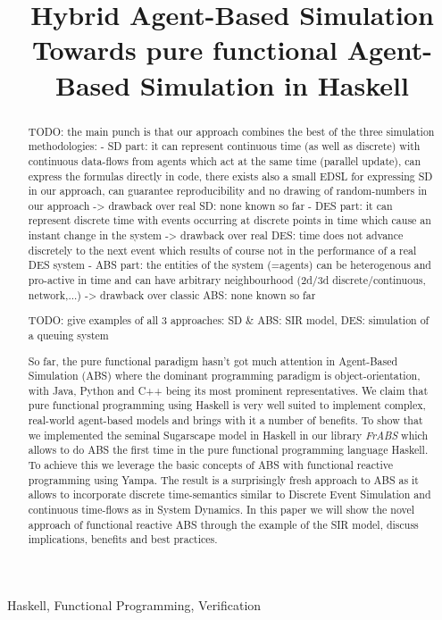 \documentclass[10pt, onecolumn, conference]{../../../templates/IEEEtran/IEEEtran}
\title{Hybrid Agent-Based Simulation \\ {\large Towards pure functional Agent-Based Simulation in Haskell}}
\author{
	\IEEEauthorblockN{Jonathan Thaler}
	\IEEEauthorblockA{School of Computer Science\\
		University of Nottingham\\
		jonathan.thaler@nottingham.ac.uk}
		
	\and
		
	\IEEEauthorblockN{Peer-Olaf Siebers}
	\IEEEauthorblockA{School of Computer Science\\
		University of Nottingham\\
		peer-olaf.siebers@nottingham.ac.uk}
}
\begin{document}
\maketitle 

\begin{abstract}
TODO: the main punch is that our approach combines the best of the three simulation methodologies:
	- SD part: 	it can represent continuous time (as well as discrete) with continuous data-flows from agents which act at the same time (parallel update), can express the formulas directly in code, there exists also a small EDSL for expressing SD in our approach, can guarantee reproducibility and no drawing of random-numbers in our approach
		-> drawback over real SD: none known so far 
	- DES part: it can represent discrete time with events occurring at discrete points in time which cause an instant change in the system
		-> drawback over real DES: time does not advance discretely to the next event which results of course not in the performance of a real DES system
	- ABS part:	the entities of the system (=agents) can be heterogenous and pro-active in time and can have arbitrary neighbourhood (2d/3d discrete/continuous, network,...)
		-> drawback over classic ABS: none known so far 

TODO: give examples of all 3 approaches: SD & ABS: SIR model, DES: simulation of a queuing system

So far, the pure functional paradigm hasn't got much attention in Agent-Based Simulation (ABS) where the dominant programming paradigm is object-orientation, with Java, Python and C++ being its most prominent representatives. We claim that pure functional programming using Haskell is very well suited to implement complex, real-world agent-based models and brings with it a number of benefits. To show that we implemented the seminal Sugarscape model in Haskell in our library \textit{FrABS} which allows to do ABS the first time in the pure functional programming language Haskell. To achieve this we leverage the basic concepts of ABS with functional reactive programming using Yampa. The result is a surprisingly fresh approach to ABS as it allows to incorporate discrete time-semantics similar to Discrete Event Simulation and continuous time-flows as in System Dynamics. In this paper we will show the novel approach of functional reactive ABS through the example of the SIR model, discuss implications, benefits and best practices.
\end{abstract}

\begin{IEEEkeywords}
Haskell, Functional Programming, Verification
\end{IEEEkeywords}
\end{document}
